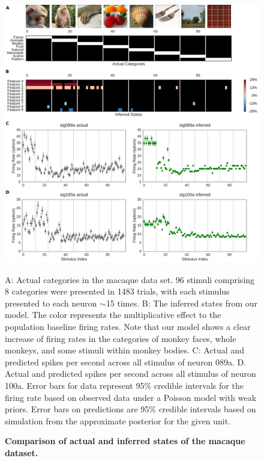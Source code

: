 \documentclass[12pt,a4paper]{article}
\begin{document}
\begin{figure}[!ht]
    \includegraphics[width=\linewidth]{figures/imgclust}
	\caption{\bf Comparison of actual and inferred states of the macaque dataset.}
	A: Actual categories in the macaque data set. 96 stimuli comprising 8 categories were presented in 1483 trials, with each stimulus presented to each neuron $\sim$15 times. B: The inferred states from our model. The color represents the multiplicative effect to the population baseline firing rates. Note that our model shows a clear increase of firing rates in the categories of monkey faces, whole monkeys, and some stimuli within monkey bodies. C: Actual and predicted spikes per second across all stimulus of neuron 089a. D. Actual and predicted spikes per second across all stimulus of neuron 100a. Error bars for data represent 95\% credible intervals for the firing rate based on observed data under a Poisson model with weak priors. Error bars on predictions are 95\% credible intervals based on simulation from the approximate posterior for the given unit.
	\label{fig:imgclust}
\end{figure}
\end{document}
